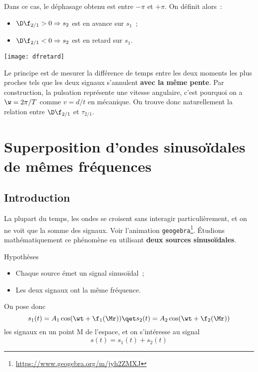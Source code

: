 \documentclass[../main/main.tex]{subfiles}
\begin{document}
\begin{minipage}{0.70\linewidth}
    Dans ce cas, le déphasage obtenu est entre $-\pi$ et $+\pi$. On définit alors~:
    \begin{itemize}
        \item $\D\f_{2/1} > 0 \Rightarrow s_2$ est en avance sur $s_1$~;
        \item $\D\f_{2/1} < 0 \Rightarrow s_2$ est en retard sur $s_1$.
    \end{itemize}
\end{minipage}
\begin{minipage}{0.30\linewidth}
    \begin{center}
        \texttt{[image: dfretard]}
    \end{center}
\end{minipage}

Le principe est de mesurer la différence de temps entre les deux moments les
plus proches tels que les deux signaux s'annulent \textbf{avec la même pente}.
Par construction, la pulsation représente une vitesse angulaire, c'est pourquoi
on a $\w = 2\pi/T$ comme $v = d/t$ en mécanique. On trouve donc naturellement la
relation entre $\D\f_{2/1}$ et $\tau_{2/1}$.

\section{Superposition d'ondes sinuso\"idales de mêmes fréquences}
\subsection{Introduction}

La plupart du temps, les ondes se croisent sans interagir particulièrement, et
on ne voit que la somme des signaux. Voir l'animation
\texttt{geogebra}\footnote{\url{https://www.geogebra.org/m/jyh2ZMXJ}}. Étudions
mathématiquement ce phénomène en utilisant \textbf{deux sources sinusoïdales}.

\begin{rdefi}{Hypothèses}
    \begin{itemize}
        \item Chaque source émet un signal sinusoïdal~;
        \item Les deux signaux ont la même fréquence.
    \end{itemize} 
\end{rdefi}
\noindent
On pose donc
\[
    s_1(t) = A_1\cos(\wt+\f_1(\Mr))
    \qet
    s_2(t) = A_2\cos(\wt+\f_2(\Mr))
\]
les signaux en un point M de l'espace, et on s'intéresse au signal
\[s(t) = s_1(t) + s_2(t)\]
\end{document}

